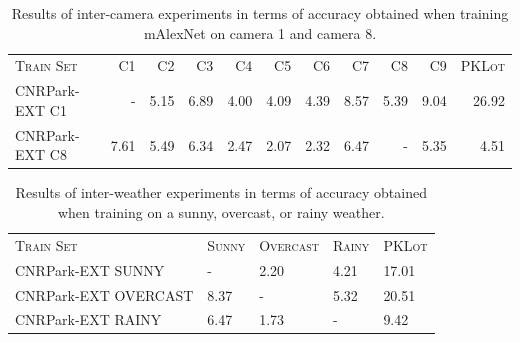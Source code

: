 \begin{table}
\begin{tabularx}{\linewidth}{Xrrrrrrrrrr}
\toprule
\textsc{Train Set} &   \textsc{C1} &   \textsc{C2} &   \textsc{C3} &   \textsc{C4} &   \textsc{C5} &   \textsc{C6} &   \textsc{C7} &   \textsc{C8} &   \textsc{C9} & \textsc{PKLot} \\
                   \cmidrule(lr){2-2} \cmidrule(lr){3-3} \cmidrule(lr){4-4} \cmidrule(lr){5-5} \cmidrule(lr){6-6} \cmidrule(lr){7-7} \cmidrule(lr){8-8} \cmidrule(lr){9-9} \cmidrule(lr){10-10} \cmidrule(lr){11-11}
CNRPark-EXT C1 &    - & 5.15 & 6.89 & 4.00 & 4.09 & 4.39 & 8.57 & 5.39 & 9.04 & 26.92 \\
CNRPark-EXT C8 & 7.61 & 5.49 & 6.34 & 2.47 & 2.07 & 2.32 & 6.47 &    - & 5.35 &  4.51 \\
\bottomrule
\end{tabularx}
\caption{Results of inter-camera experiments in terms of accuracy obtained when training mAlexNet on camera 1 and camera 8.}
\label{tab:mini:inter-camera}
\end{table}

\begin{table}
\begin{tabularx}{\linewidth}{lRRRR}
\toprule
\textsc{Train Set} & \textsc{Sunny} & \textsc{Overcast} & \textsc{Rainy} & \textsc{PKLot} \\
                     \cmidrule(lr){2-2} \cmidrule(lr){3-3} \cmidrule(lr){4-4} \cmidrule(lr){5-5}
CNRPark-EXT SUNNY    &    - & 2.20  & 4.21 & 17.01 \\
CNRPark-EXT OVERCAST & 8.37 &    -  & 5.32 & 20.51 \\
CNRPark-EXT RAINY    & 6.47 & 1.73  &    - &  9.42 \\
\bottomrule
\end{tabularx}
\caption{Results of inter-weather experiments in terms of accuracy obtained when training on a sunny, overcast, or rainy weather.}
\label{tab:mini:inter-weather}
\end{table}

